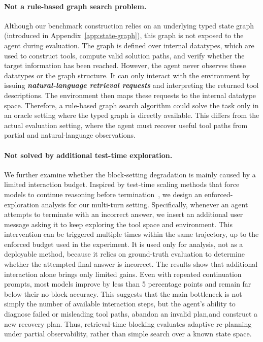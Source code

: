 \paragraph{Not a rule-based graph search problem.}
Although our benchmark construction relies on an underlying typed state graph (introduced in Appendix~\ref{app:state-graph}), this graph is not exposed to the agent during evaluation. 
The graph is defined over internal datatypes, which are used to construct tools, compute valid solution paths, and verify whether the target information has been reached. 
However, the agent never observes these datatypes or the graph structure. 
It can only interact with the environment by issuing \textit{\textbf{natural-language retrieval requests}} and interpreting the returned tool descriptions. 
The environment then maps these requests to the internal datatype space. 
Therefore, a rule-based graph search algorithm could solve the task only in an oracle setting where the typed graph is directly available. 
This differs from the actual evaluation setting, where the agent must recover useful tool paths from partial and natural-language observations.

\paragraph{Not solved by additional test-time exploration.}
We further examine whether the block-setting degradation is mainly caused by a limited interaction budget.
Inspired by test-time scaling methods that force models to continue reasoning before termination~\citep{s1}, we design an enforced-exploration analysis for our multi-turn setting.
Specifically, whenever an agent attempts to terminate with an incorrect answer, we insert an additional user message asking it to keep exploring the tool space and environment.
This intervention can be triggered multiple times within the same trajectory, up to the enforced budget used in the experiment.
It is used only for analysis, not as a deployable method, because it relies on ground-truth evaluation to determine whether the attempted final answer is incorrect.
The results show that additional interaction alone brings only limited gains.
Even with repeated continuation prompts, most models improve by less than 5 percentage points and remain far below their no-block accuracy.
This suggests that the main bottleneck is not simply the number of available interaction steps, but the agent's ability to diagnose failed or misleading tool paths, abandon an invalid plan,and construct a new recovery plan.
Thus, retrieval-time blocking evaluates adaptive re-planning under partial observability, rather than simple search over a known state space.


